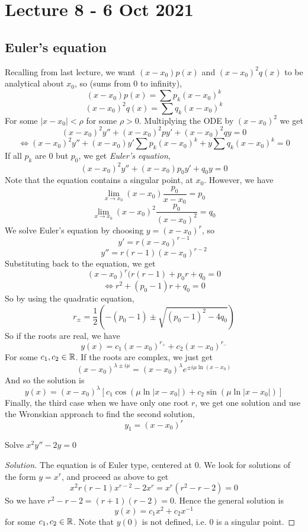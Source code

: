 \section{Lecture 8 - 6 Oct 2021}
\subsection{Euler's equation}
Recalling from last lecture, we want $(x-x_0)p(x)$ and $(x-x_0)^2q(x)$ to be analytical
about $x_0$, so (sums from 0 to infinity),
\[(x-x_0)p(x)=\sum p_k(x-x_0)^k\]
\[(x-x_0)^2q(x)=\sum q_k(x-x_0)^k\]
For some $|x-x_0|<\rho$ for some $\rho>0$. Multiplying the ODE by $(x-x_0)^2$ we get
\[(x-x_0)^2y'' + (x-x_0)^2 p y' + (x-x_0)^2 q y = 0\]
\[\iff (x-x_0)^2y'' + (x-x_0)y'\sum p_k(x-x_0)^k + y\sum q_k(x-x_0)^k = 0\]
If all $p_k$ are 0 but $p_0$, we get \emph{Euler's equation},
\[(x-x_0)^2 y'' + (x-x_0)p_0y' + q_0 y = 0\]
Note that the equation contains a singular point, at $x_0$. However, we have
\[\lim_{x\to x_0} (x-x_0)\frac{p_0}{x-x_0} = p_0\]
\[\lim_{x\to x_0} (x-x_0)^2\frac{p_0}{(x-x_0)^2} = q_0\]
We solve Euler's equation by choosing $y=(x-x_0)^r$, so 
\[y' = r(x-x_0)^{r-1}\]
\[y'' = r(r-1)(x-x_0)^{r-2}\]
Substituting back to the equation, we get
\[(x-x_0)^r (r(r-1) + p_0 r + q_0 = 0\]
\[\iff r^2 + (p_0 -1)r + q_0 = 0\]
So by using the quadratic equation,
\[ r_{\pm} = \frac{1}{2}(-(p_0-1)\pm \sqrt{(p_0 -1)^2 - 4q_0}) \]
So if the roots are real, we have
\[y(x)= c_1(x-x_0)^{r_{+}} + c_2 (x-x_0)^{r_-}\]
For some $c_1,c_2\in\mathbb R$. If the roots are complex, we just get 
\[(x-x_0)^{\lambda \pm i\mu} = (x-x_0)^{\lambda} e^{\pm i\mu \ln (x-x_0)}\]
And so the solution is
\[y(x)= (x-x_0)^{\lambda} [c_1\cos (\mu \ln |x-x_0|) + c_2 \sin (\mu \ln |x-x_0|)]\]
Finally, the third case when we have only one root $r$, we get one solution and use the
Wronskian approach to find the second solution,
\[y_1 = (x-x_0)^r\]


\begin{example}
  Solve $x^{2} y'' - 2y = 0$
\end{example}
\begin{proof} [Solution]
  The equation is of Euler type, centered at $0$. We look for solutions of the form
  $y=x^r$, and proceed as above to get 
  \[x^2r(r-1) x^{r-2} - 2x^r = x^r(r^2 - r - 2)=0\]
  So we have $r^2 - r -2 = (r+1)(r-2)=0$. Hence the general solution is
  \[y(x) = c_1x^2 + c_2 x^{-1}\]
  for some $c_1,c_2\in\mathbb R$. Note that $y(0)$ is not defined, i.e. $0$ is a singular point.
\end{proof}


